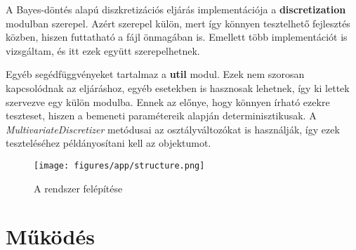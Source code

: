 A Bayes-döntés alapú diszkretizációs eljárás implementációja a \textbf{discretization} modulban szerepel. Azért szerepel külön, mert így könnyen tesztelhető fejlesztés közben, hiszen futtatható a fájl önmagában is. Emellett több implementációt is vizsgáltam, és itt ezek együtt szerepelhetnek.

Egyéb segédfüggvényeket tartalmaz a \textbf{util} modul. Ezek nem szorosan kapcsolódnak az eljáráshoz, egyéb esetekben is hasznosak lehetnek, így ki lettek szervezve egy külön modulba. Ennek az előnye, hogy könnyen írható ezekre teszteset, hiszen a bemeneti paramétereik alapján determinisztikusak. A \textit{MultivariateDiscretizer} metódusai az osztályváltozókat is használják, így ezek teszteléséhez példányosítani kell az objektumot.

\begin{figure}[htp]
    \centering
    \texttt{[image: figures/app/structure.png]}
    \caption{A rendszer felépítése}
    \label{fig:struktura-diagram}
\end{figure}


\section{Működés}
